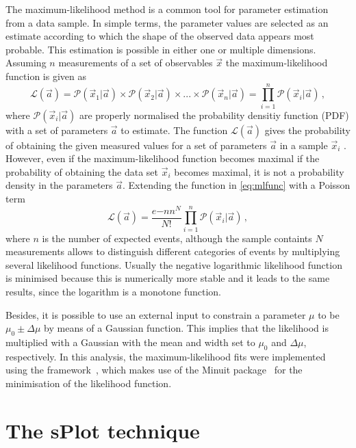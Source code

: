 The maximum-likelihood method is a common tool for parameter estimation from a data sample.
In simple terms, the parameter values are selected as an estimate according to which the shape of the observed data appears most probable.
This estimation is possible in either one or multiple dimensions.
Assuming $n$ measurements of a set of observables $\vec{x}$ the maximum-likelihood function is given as
\begin{equation}
\mathcal{L}(\vec{a})=\mathcal{P}(\vec{x}_1|\vec{a})\times\mathcal{P}(\vec{x}_2|\vec{a})\times...\times\mathcal{P}(\vec{x}_n|\vec{a})=\prod_{i=1}^{n}\mathcal{P}(\vec{x}_i|\vec{a})\,,\label{eq:mlfunc}
\end{equation}
where $\mathcal{P}(\vec{x}_i|\vec{a})$ are properly normalised the probability densitiy function (PDF) with a set of parameters $\vec{a}$ to estimate.
The function $\mathcal{L}(\vec{a})$ gives the probability of obtaining the given measured values for a set of parameters $\vec{a}$ in a sample $\vec{x}_i$ .
However, even if the maximum-likelihood function becomes maximal if the probability of obtaining the data set $\vec{x}_i$ becomes maximal, it is not a probability density in the parameters $\vec{a}$.
Extending the function in \cref{eq:mlfunc} with a Poisson term
\begin{equation}
\mathcal{L}(\vec{a})=\frac{e{-n}n^N}{N!}\prod_{i=1}^{n}\mathcal{P}(\vec{x}_i|\vec{a})\,,
\end{equation}
where $n$ is the number of expected events, although the sample containts $N$ measurements allows to distinguish different categories of events by multiplying several likelihood functions.
Usually the negative logarithmic likelihood function is minimised because this is numerically more stable and it leads to the same results, since the logarithm is a monotone function.

Besides, it is possible to use an external input to constrain a parameter $\mu$ to be $\mu_0\pm\Delta\mu$ by means of a Gaussian function.
This implies that the likelihood is multiplied with a Gaussian with the mean and width set to $\mu_0$ and $\Delta\mu$, respectively.
In this analysis, the maximum-likelihood fits were implemented using the \root framework~\cite{Antcheva:2009zz}, which makes use of the Minuit package~\cite{James:1975dr} for the minimisation of the likelihood function.


\section{The sPlot technique}
\label{sec:splot}

